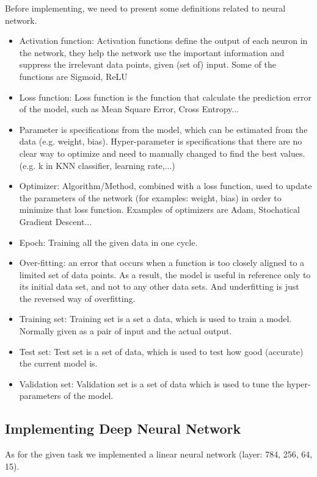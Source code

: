 \documentclass[11pt]{article}
\begin{document}
Before implementing, we need to present some definitions related to neural network.
\begin{itemize}
    \item Activation function: Activation functions define the output of each neuron in the network, they help the network use the important information and suppress the irrelevant data points, given (set of) input. Some of the functions are Sigmoid, ReLU
    \item Loss function: Loss function is the function that calculate the prediction error of the model, such as Mean Square Error, Cross Entropy...
    \item Parameter is specifications from the model, which can be estimated from the data (e.g. weight, bias). Hyper-parameter is specifications that there are no clear way to optimize and need to manually changed to find the best values. (e.g. k in KNN classifier, learning rate,...)
    \item Optimizer: Algorithm/Method, combined with a loss function, used to update the parameters of the network (for examples: weight, bias) in order to minimize that loss function. Examples of optimizers are Adam, Stochatical Gradient Descent...
    \item Epoch: Training all the given data in one cycle.
    \item Over-fitting: an error that occurs when a function is too closely aligned to a limited set of data points. As a result, the model is useful in reference only to its initial data set, and not to any other data sets. And underfitting is just the reversed way of overfitting.
    \item Training set: Training set is a set a data, which is used to train a model. Normally given as a pair of input and the actual output.
    \item Test set: Test set is a set of data, which is used to test how good (accurate) the current model is.
    \item Validation set: Validation set is a set of data which is used to tune the hyper-parameters of the model.
\end{itemize}

\subsection{Implementing Deep Neural Network}

As for the given task we implemented a linear neural network (layer: 784, 256, 64, 15).
\end{document}
